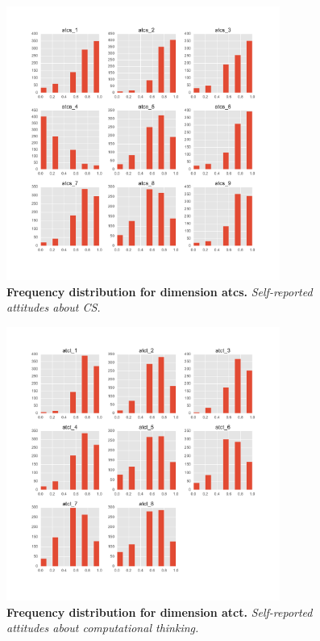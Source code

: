 \begin{figure}[!hbtp]
\centering
    \includegraphics[width=0.8\textwidth]{figures/atcs_dimension}
    \caption{\textbf{Frequency distribution for dimension atcs. }\textit{Self-reported attitudes about CS.}}\label{atcs_dimension}
\end{figure}

\begin{figure}[!hbtp]
\centering

    \includegraphics[width=0.8\textwidth]{figures/atct_dimension}
    \caption{\textbf{Frequency distribution for dimension atct. }\textit{Self-reported attitudes about computational thinking.}}\label{atct_dimension}
\end{figure}

